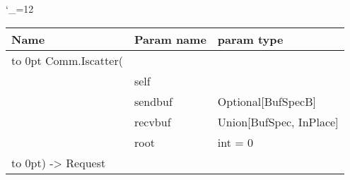 \begingroup \catcode`\_=12 \tt
\begin{tabular}{lll}
\toprule
\textrm{Name}&\textrm{Param name}&\textrm{param type}\\
\midrule
\hbox to 0pt {Comm.Iscatter(\hss}\\
& self\\
& sendbuf & Optional[BufSpecB]\\
& recvbuf & Union[BufSpec, InPlace]\\
& root & int = 0\\
\hbox to 0pt{) -> Request\hss}\\
\bottomrule
\end{tabular}
\endgroup

